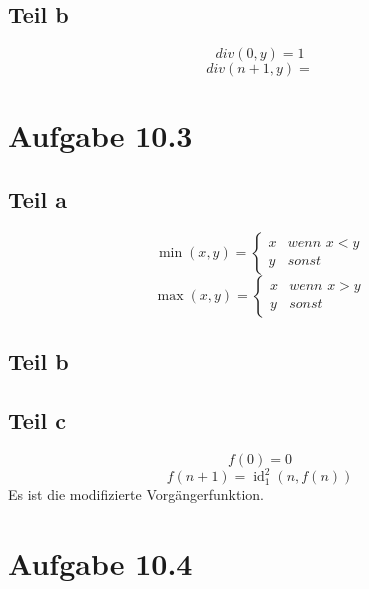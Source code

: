 \documentclass[10pt,a4paper]{article}
\DeclareMathOperator{\id}{id}
\begin{document}
\subsection{Teil b}

\begin{equation}
  div(0, y) = 1
\end{equation}
\begin{equation}
  div(n + 1, y) =
\end{equation}

\section{Aufgabe 10.3}

\subsection{Teil a}

\begin{equation}
  \min(x, y) = \begin{cases}
    x & \textit{wenn $x < y$}\\
    y & \textit{sonst}
  \end{cases}
\end{equation}
\begin{equation}
  \max(x, y) = \begin{cases}
    x & \textit{wenn $x > y$}\\
    y & \textit{sonst}
  \end{cases}
\end{equation}

\subsection{Teil b}

\subsection{Teil c}

\begin{equation}
  f(0) = 0
\end{equation}
\begin{equation}
  f(n + 1) = \id^{2}_{1}(n, f(n))
\end{equation}
Es ist die modifizierte Vorgängerfunktion.

\section{Aufgabe 10.4}
\end{document}
